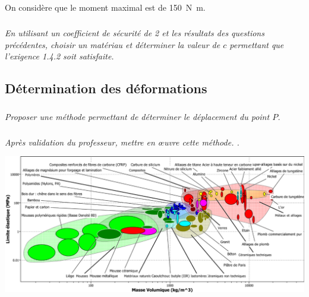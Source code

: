 \documentclass[10pt,fleqn]{article} %
\begin{document}
\begin{multicols}{2}
On considère que le moment maximal est de \SI{150}{N.m}. 
\subparagraph{}\textit{En utilisant un coefficient de sécurité de 2 et les résultats des questions précédentes, choisir un matériau et déterminer la valeur de $c$  permettant que l’exigence 1.4.2 soit satisfaite.}


\subsection*{Détermination des déformations}

\subparagraph{}\textit{Proposer une méthode permettant de déterminer le déplacement du point $P$.}

\subparagraph{}\textit{Après validation du professeur, mettre en \oe{}uvre cette méthode. .}
\end{multicols}


\begin{center}
\includegraphics[width=\linewidth]{images/fig_07}
\end{center}

%
\end{document}

